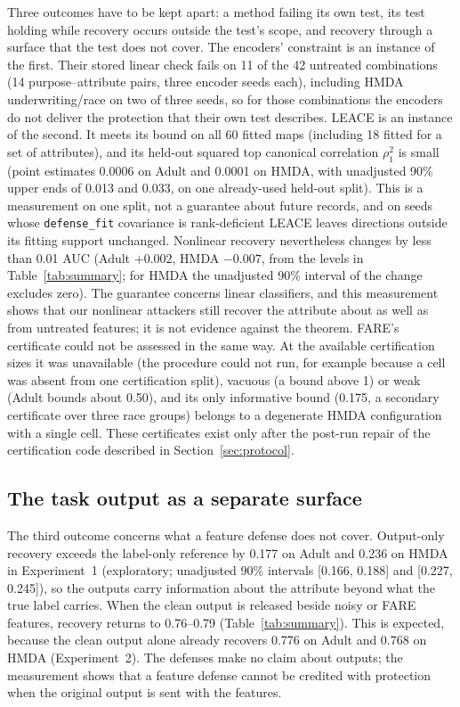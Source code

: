 \documentclass[10pt]{article}
\begin{document}
Three outcomes have to be kept apart: a method failing its own test, its test holding while recovery occurs outside the
test's scope, and recovery through a surface that the test does not cover. The encoders' constraint is an instance of
the first. Their stored linear check fails on 11 of the 42 untreated combinations (14 purpose--attribute pairs, three encoder
seeds each), including HMDA
underwriting/race on two of three seeds, so for those combinations the encoders do not deliver the protection that their
own test describes. LEACE is an instance of the second. It meets its bound on all 60 fitted maps (including 18 fitted for a set of
attributes), and its held-out squared top canonical correlation $\rho_1^2$ is small (point estimates 0.0006 on Adult
and 0.0001 on HMDA, with unadjusted 90\% upper ends of 0.013 and 0.033, on one already-used held-out split). This is a
measurement on one split, not a guarantee about future records, and on seeds whose \texttt{defense\_fit} covariance is
rank-deficient LEACE leaves directions outside its fitting support unchanged. Nonlinear recovery nevertheless changes by less than 0.01 AUC (Adult $+0.002$, HMDA $-0.007$, from the levels in Table~\ref{tab:summary}; for HMDA the unadjusted 90\% interval of the
change excludes zero). The guarantee concerns linear
classifiers, and this measurement shows that our nonlinear attackers still recover the attribute about as well as from
untreated features; it is not evidence against the theorem. FARE's certificate could not be assessed in the same way. At the available certification sizes it was unavailable (the procedure could not run, for example
because a cell was absent from one certification split), vacuous (a bound above 1) or weak (Adult bounds about 0.50), and its only informative bound (0.175, a secondary certificate over three race groups) belongs to a degenerate HMDA
configuration with a single cell. These certificates exist only after the post-run repair of the certification code
described in Section~\ref{sec:protocol}.

\subsection{The task output as a separate surface}\label{sec:outputs}

The third outcome concerns what a feature defense does not cover. Output-only recovery exceeds the label-only reference by 0.177 on Adult and 0.236 on HMDA in Experiment~1 (exploratory;
unadjusted 90\% intervals [0.166, 0.188] and [0.227, 0.245]), so the outputs carry information about the attribute beyond what the true label
carries. When the clean output is released beside noisy or FARE features, recovery returns to 0.76--0.79
(Table~\ref{tab:summary}). This is expected, because the clean output alone already recovers 0.776 on Adult and 0.768 on HMDA (Experiment~2). The defenses make no claim about outputs; the measurement shows that a feature defense cannot be credited with
protection when the original output is sent with the features.
\end{document}
